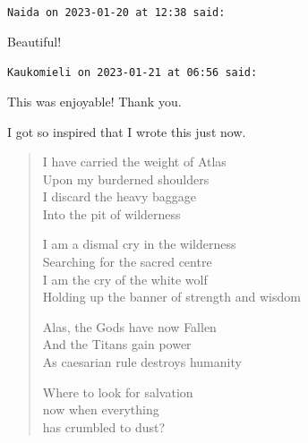 \begin{footnotesize}
\begin{sffamily}
\texttt{Naida on 2023-01-20 at 12:38 said:}

Beautiful!

\hfill

\texttt{Kaukomieli on 2023-01-21 at 06:56 said:}

This was enjoyable! Thank you.

I got so inspired that I wrote this just now.
\begin{verse}
I have carried the weight of Atlas\\ Upon my burderned shoulders\\ I discard the heavy baggage\\ Into the pit of wilderness

I am a dismal cry in the wilderness\\ Searching for the sacred centre\\ I am the cry of the white wolf\\ Holding up the banner of strength and wisdom

Alas, the Gods have now Fallen\\ And the Titans gain power\\ As caesarian rule destroys humanity

Where to look for salvation\\ now when everything\\ has crumbled to dust?
\end{verse}

\hfill

\end{sffamily}
\end{footnotesize}

